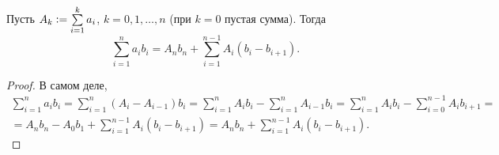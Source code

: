 \begin{theorem}
    Пусть $A_k \vcentcolon = \sum\limits_{i = 1}^ka_i$, $k = 0, 1, \ldots, n$ (при $k = 0$ пустая сумма). Тогда
    \[
        \sum_{i = 1}^na_ib_i = A_nb_n + \sum_{i = 1}^{n - 1}A_i(b_i - b_{i + 1}).
    \]
\end{theorem}

\begin{proof}
    В самом деле,
    \begin{multline*}
        \sum_{i = 1}^na_ib_i = \sum_{i = 1}^n(A_i - A_{i - 1})b_i = \sum_{i = 1}^nA_ib_i - \sum_{i = 1}^nA_{i - 1}b_i = \sum_{i = 1}^nA_ib_i - \sum_{i = 0}^{n - 1}A_ib_{i + 1} =\\ = A_nb_n - A_0b_1 + \sum_{i = 1}^{n - 1}A_i(b_i - b_{i + 1}) = A_nb_n + \sum_{i = 1}^{n - 1}A_i(b_i - b_{i + 1}).
    \end{multline*}
\end{proof}

